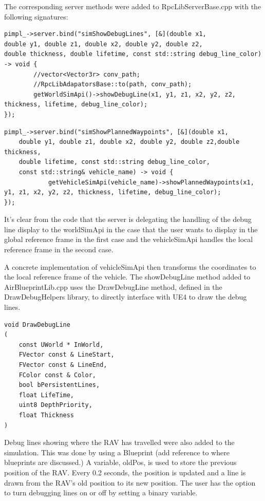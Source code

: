 The corresponding server methods were added to RpcLibServerBase.cpp with the following signatures:
\begin{verbatim}
pimpl_->server.bind("simShowDebugLines", [&](double x1,
double y1, double z1, double x2, double y2, double z2,
double thickness, double lifetime, const std::string debug_line_color)
-> void {
		//vector<Vector3r> conv_path;
		//RpcLibAdapatorsBase::to(path, conv_path);
		getWorldSimApi()->showDebugLine(x1, y1, z1, x2, y2, z2, thickness, lifetime, debug_line_color);
});
\end{verbatim}

\begin{verbatim}
pimpl_->server.bind("simShowPlannedWaypoints", [&](double x1, 
    double y1, double z1, double x2, double y2, double z2,double thickness, 
    double lifetime, const std::string debug_line_color,
    const std::string& vehicle_name) -> void {
			getVehicleSimApi(vehicle_name)->showPlannedWaypoints(x1, y1, z1, x2, y2, z2, thickness, lifetime, debug_line_color);
});
\end{verbatim}

It's clear from the code that the server is delegating the handling of the debug line display to the worldSimApi in the case that the user wants to display in the global reference frame in the first case and the vehicleSimApi handles the local reference frame in the second case. 

A concrete implementation of vehicleSimApi then transforms the coordinates to the local reference frame of the vehicle. The showDebugLine method added to AirBlueprintLib.cpp uses the DrawDebugLine method, defined in the DrawDebugHelpers library, to directly interface with UE4 to draw the debug lines.

\begin{verbatim}
void DrawDebugLine
(
    const UWorld * InWorld,
    FVector const & LineStart,
    FVector const & LineEnd,
    FColor const & Color,
    bool bPersistentLines,
    float LifeTime,
    uint8 DepthPriority,
    float Thickness
)
\end{verbatim}
\par


Debug lines showing where the RAV has travelled were also added to the simulation. This was done by using a Blueprint (add reference to where blueprints are discussed.) A variable, oldPos, is used to store the previous position of the RAV. Every 0.2 seconds, the position is updated and a line is drawn from the RAV's old position to its new position. The user has the option to turn debugging lines on or off by setting a binary variable.

